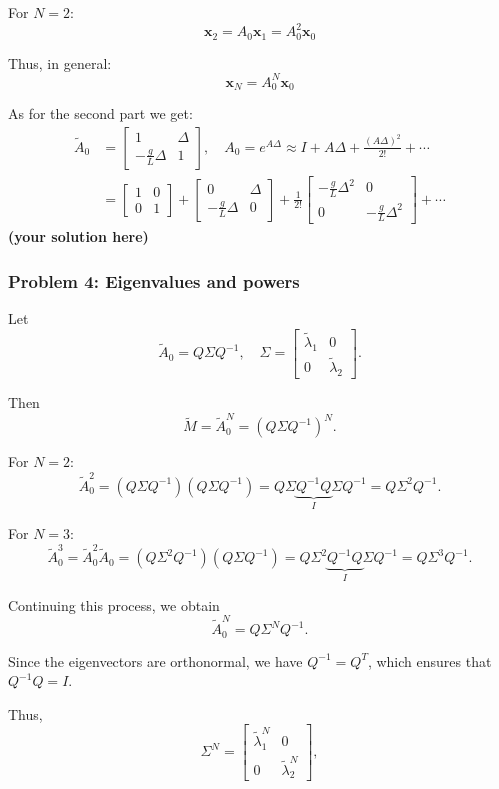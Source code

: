\documentclass[12pt,twoside]{article}
\newcommand\redt[1]{ {\textcolor[rgb]{0.60, 0.00, 0.00}{\textbf{ #1} } } }
\newcommand{\yoursolution}{ \redt{(your solution here) } }
\begin{document}
For $N=2$:
\[
\mathbf{x}_2 = A_0 \mathbf{x}_1 = A_0^2 \mathbf{x}_0
\]

Thus, in general:
\[
\mathbf{x}_N = A_0^N \mathbf{x}_0
\]

As for the second part we get:
\begin{align}
\tilde A_0 & = 
\begin{bmatrix}
1 & \Delta \\
-\frac{g}{L}\Delta & 1
\end{bmatrix}, 
\quad 
A_0 = e^{A\Delta} \approx I + A\Delta + \frac{(A\Delta)^2}{2!} + \cdots \\
& =
\begin{bmatrix}
1 & 0 \\
0 & 1
\end{bmatrix}
+
\begin{bmatrix}
0 & \Delta \\
-\frac{g}{L}\Delta & 0
\end{bmatrix}
+
\frac{1}{2!}
\begin{bmatrix}
-\frac{g}{L}\Delta^2 & 0 \\
0 & -\frac{g}{L}\Delta^2
\end{bmatrix}
+ \cdots
\end{align}
		\yoursolution 	
\subsubsection*{{\color{red}Problem 4:  Eigenvalues and powers}}
	
Let
\[
\tilde{A}_0 = Q \Sigma Q^{-1}, \quad 
\Sigma =
\begin{bmatrix}
\tilde{\lambda}_1 & 0 \\
0 & \tilde{\lambda}_2
\end{bmatrix}.
\]

Then
\[
\tilde{M} = \tilde{A}_0^N = (Q \Sigma Q^{-1})^N.
\]

For $N=2$:
\[
\tilde{A}_0^2 = (Q \Sigma Q^{-1})(Q \Sigma Q^{-1})
= Q \Sigma \underbrace{Q^{-1}Q}_{I} \Sigma Q^{-1}
= Q \Sigma^2 Q^{-1}.
\]

For $N=3$:
\[
\tilde{A}_0^3 = \tilde{A}_0^2 \tilde{A}_0
= (Q \Sigma^2 Q^{-1})(Q \Sigma Q^{-1})
= Q \Sigma^2 \underbrace{Q^{-1}Q}_{I} \Sigma Q^{-1}
= Q \Sigma^3 Q^{-1}.
\]

Continuing this process, we obtain
\[
\tilde{A}_0^N = Q \Sigma^N Q^{-1}.
\]

Since the eigenvectors are orthonormal, we have $Q^{-1} = Q^T$, which ensures that $Q^{-1}Q = I$.

Thus,
\[
\Sigma^N =
\begin{bmatrix}
\tilde{\lambda}_1^N & 0 \\
0 & \tilde{\lambda}_2^N
\end{bmatrix},
\]
\end{document}
